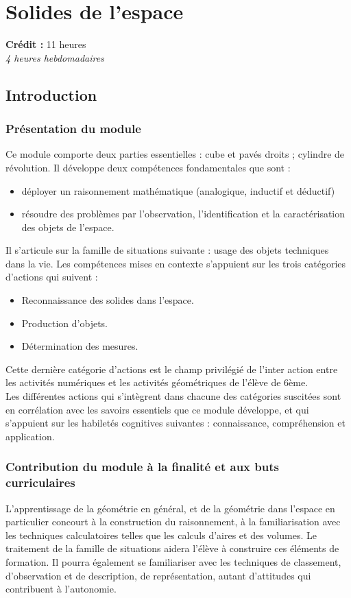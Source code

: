 \chapter{Solides de l'espace}

{\AlegreyaSansLight \large
\begin{center}
\textbf{Crédit :} 11 heures\\
\textit{4 heures hebdomadaires}
\end{center}
}

\minitoc

\section{Introduction}

\subsection{Présentation du module}
Ce module comporte deux parties essentielles : cube et pavés droits ; cylindre de révolution. Il développe deux compétences fondamentales que sont :
\begin{itemize}
\item déployer un raisonnement mathématique (analogique, inductif et déductif)
\item résoudre des problèmes par l'observation, l'identification et la caractérisation des objets de l'espace.
\end{itemize}
Il s'articule sur la famille de situations suivante : usage des objets techniques dans la vie. Les compétences mises en contexte s'appuient sur les trois catégories d'actions qui suivent :
\begin{itemize}
\item Reconnaissance des solides dans l'espace.
\item Production d'objets.
\item Détermination des mesures.
\end{itemize}
Cette dernière catégorie d'actions est le champ privilégié de l'inter action entre les activités numériques et les activités géométriques de l'élève de 6ème.\\
Les différentes actions qui s'intègrent dans chacune des catégories suscitées sont en corrélation avec les savoirs essentiels que ce module développe, et qui s'appuient sur les habiletés cognitives suivantes : connaissance, compréhension et application.
\subsection{Contribution du module à la finalité et aux buts curriculaires}
L'apprentissage de la géométrie en général, et de la géométrie dans l'espace en particulier concourt à la construction du raisonnement, à la familiarisation avec les techniques calculatoires telles que les calculs d'aires et des volumes. Le traitement de la famille de situations aidera l'élève à construire ces éléments de formation. Il pourra également se familiariser avec les techniques de classement, d'observation et de description, de représentation, autant d'attitudes qui contribuent à l'autonomie.

